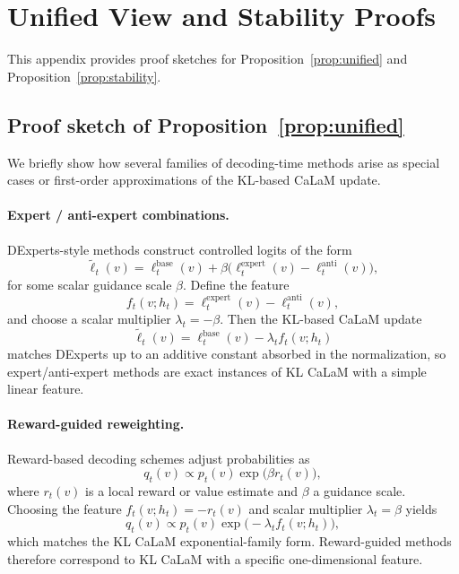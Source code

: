 \documentclass{article}
\theoremstyle{plain}
\theoremstyle{definition}
\theoremstyle{remark}
\begin{document}
\section{Unified View and Stability Proofs}
\label{app:unified}

This appendix provides proof sketches for Proposition~\ref{prop:unified} and Proposition~\ref{prop:stability}.

\subsection{Proof sketch of Proposition~\ref{prop:unified}}

We briefly show how several families of decoding-time methods arise as special cases or first-order approximations of the KL-based CaLaM update.

\paragraph{Expert / anti-expert combinations.}
DExperts-style methods construct controlled logits of the form
\begin{equation}
  \tilde{\ell}_t(v)
  =
  \ell_t^{\text{base}}(v)
  + \beta \Big(
      \ell_t^{\text{expert}}(v)
      - \ell_t^{\text{anti}}(v)
    \Big),
\end{equation}
for some scalar guidance scale $\beta$.
Define the feature
\begin{equation}
  f_t(v;h_t)
  =
  \ell_t^{\text{expert}}(v) - \ell_t^{\text{anti}}(v),
\end{equation}
and choose a scalar multiplier $\lambda_t = -\beta$.
Then the KL-based CaLaM update
\begin{equation}
  \tilde{\ell}_t(v)
  =
  \ell_t^{\text{base}}(v) - \lambda_t f_t(v;h_t)
\end{equation}
matches DExperts up to an additive constant absorbed in the normalization, so expert/anti-expert methods are exact instances of KL CaLaM with a simple linear feature.

\paragraph{Reward-guided reweighting.}
Reward-based decoding schemes adjust probabilities as
\begin{equation}
  q_t(v)
  \propto
  p_t(v)\exp\big(\beta r_t(v)\big),
\end{equation}
where $r_t(v)$ is a local reward or value estimate and $\beta$ a guidance scale.
Choosing the feature $f_t(v;h_t) = -r_t(v)$ and scalar multiplier $\lambda_t = \beta$ yields
\begin{equation}
  q_t(v)
  \propto
  p_t(v)\exp\big(-\lambda_t f_t(v;h_t)\big),
\end{equation}
which matches the KL CaLaM exponential-family form.
Reward-guided methods therefore correspond to KL CaLaM with a specific one-dimensional feature.
\end{document}
